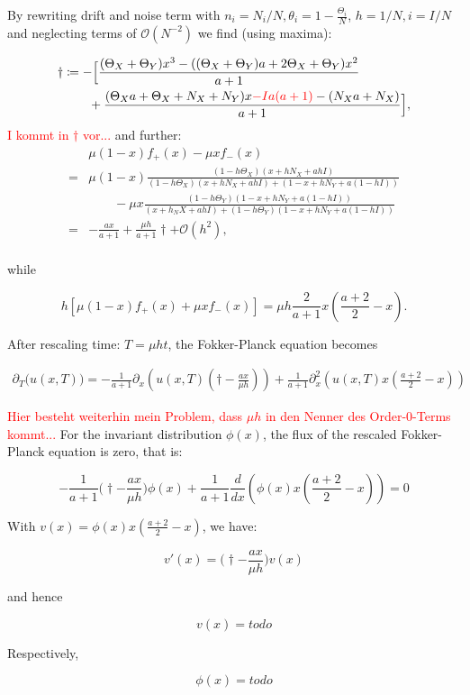 By rewriting drift and noise term with $n_i = N_i/N, \theta_i = 1- \frac{\Theta_i}{N}$, $h = 1/N, i= I/N$ and neglecting terms of $\mathcal{O}(N^{-2})$ we find (using maxima):

\begin{align*}
\dagger &\coloneqq -\Big[\frac{(\Theta_X + \Theta_Y)x^3 - ((\Theta_X + \Theta_Y)a + 2\Theta_X + \Theta_Y)x^2}{a+1}\Big.\\
&\qquad + \Big.\frac{(\Theta_X a + \Theta_X + N_X + N_Y)x \textcolor{red}{ - Ia(a+1)} - (N_X a + N_X)}{a+1}\Big],\\
\end{align*}
\textcolor{red}{I kommt in $\dagger$ vor...}
and further: 
\begin{align*}
& \mu(1-x)f_+(x) - \mu xf_-(x)\\
= & \mu(1-x) \frac{(1-h\Theta_X) (x+ hN_X+ ahI)}{(1-h\Theta_X) (x + hN_X + ahI) + (1-x + hN_Y + a(1-hI))}\\
&\qquad - \mu x \frac{(1-h\Theta_Y)(1-x+hN_Y+a(1-hI))}{(x+h_NX+ahI) + (1-h\Theta_Y)(1-x+hN_Y+a(1-hI))}\\
=& -\frac{ax}{a+1} + \frac{\mu h}{a+1}\dagger + \mathcal{O}(h^2),\\
\end{align*}

while 

\begin{equation*}
h\left[\mu(1-x)f_+(x) + \mu xf_-(x)\right] = \mu h \frac{2}{a+1} x(\frac{a+2}{2}-x).
\end{equation*}

After rescaling time: $T = \mu h t$, the Fokker-Planck equation becomes

\begin{align*}
\partial_T \big(u\left(x, T\right)\big) = -\frac{1}{a+1}\partial_x\left(u(x,T)\left(\dagger - \frac{ax}{\mu h} \right)\right) + \frac{1}{a+1} \partial^2_x\left(u(x,T)x\left(\frac{a+2}{2}-x\right)\right)
\end{align*}

\textcolor{red}{Hier besteht weiterhin mein Problem, dass $\mu h$ in den Nenner des Order-0-Terms kommt...}\newline
For the invariant distribution $\phi(x)$, the flux of the rescaled Fokker-Planck equation is zero, that is:

\begin{equation*}
-\frac{1}{a+1}\Big(\dagger - \frac{ax}{\mu h}\Big)\phi(x) + \frac{1}{a+1} \frac{d}{dx}\left(\phi(x)x\left(\frac{a+2}{2}-x\right)\right)= 0
\end{equation*}

With $v(x) = \phi(x)x\left(\frac{a+2}{2}-x\right)$, we have:

\begin{equation*}
v'(x) = \Big(\dagger - \frac{ax}{\mu h}\Big)v(x)
\end{equation*}

and hence

\begin{equation*}
v(x) = todo
\end{equation*}

Respectively,

\begin{equation*}
\phi(x) = todo
\end{equation*}
